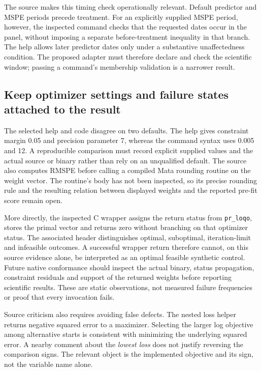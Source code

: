 The source makes this timing check operationally relevant. Default predictor
and MSPE periods precede treatment. For an explicitly supplied MSPE period,
however, the inspected command checks that the requested dates occur in the
panel, without imposing a separate before-treatment inequality in that branch.
The help allows later predictor dates only under a substantive unaffectedness
condition. The proposed adapter must therefore declare and check the scientific
window; passing a command's membership validation is a narrower result.
\citep{exec19_synth_stata_source}

\subsection{Keep optimizer settings and failure states attached to the result}
\label{exec19:synth-numerics}

The selected help and code disagree on two defaults. The help gives constraint
margin 0.05 and precision parameter 7, whereas the command syntax uses 0.005 and
12. A reproducible comparison must record explicit supplied values and the
actual source or binary rather than rely on an unqualified default. The source
also computes RMSPE before calling a compiled Mata rounding routine on the
weight vector. The routine's body has not been inspected, so its precise
rounding rule and the resulting relation between displayed weights and the
reported pre-fit score remain open.~\citep{exec19_synth_stata_source}

More directly, the inspected C wrapper assigns the return status from
\texttt{pr\_loqo}, stores the primal vector and returns zero without branching
on that optimizer status. The associated header distinguishes optimal,
suboptimal, iteration-limit and infeasible outcomes. A successful wrapper return
therefore cannot, on this source evidence alone, be interpreted as an optimal
feasible synthetic control. Future native conformance should inspect the actual
binary, status propagation, constraint residuals and support of the returned
weights before reporting scientific results. These are static observations,
not measured failure frequencies or proof that every invocation fails.
\citep{exec19_synth_stata_source}

Source criticism also requires avoiding false defects. The nested loss helper
returns negative squared error to a maximizer. Selecting the larger log
objective among alternative starts is consistent with minimizing the underlying
squared error. A nearby comment about the \emph{lowest loss} does not justify
reversing the comparison signs. The relevant object is the implemented objective
and its sign, not the variable name alone.~\citep{exec19_synth_stata_source}

